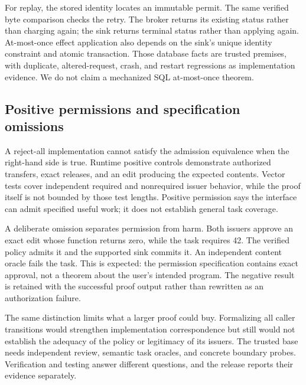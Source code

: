 For replay, the stored identity locates an immutable permit. The same verified
byte comparison checks the retry. The broker returns its existing status rather
than charging again; the sink returns terminal status rather than applying
again. At-most-once effect application also depends on the sink's unique identity
constraint and atomic transaction. Those database facts are trusted premises,
with duplicate, altered-request, crash, and restart regressions as implementation
evidence. We do not claim a mechanized SQL at-most-once theorem.

\subsection{Positive permissions and specification omissions}
A reject-all implementation cannot satisfy the admission equivalence when the
right-hand side is true. Runtime positive controls demonstrate authorized
transfers, exact releases, and an edit producing the expected contents. Vector
tests cover independent required and nonrequired issuer behavior, while the
proof itself is not bounded by those test lengths. Positive permission says
the interface can admit specified useful work; it does not establish general
task coverage.

A deliberate omission separates permission from harm. Both issuers approve an
exact edit whose function returns zero, while the task requires 42. The verified
policy admits it and the supported sink commits it. An independent content
oracle fails the task. This is expected: the permission specification contains
exact approval, not a theorem about the user's intended program. The negative
result is retained with the successful proof output rather than rewritten as an
authorization failure.

The same distinction limits what a larger proof could buy. Formalizing all
caller transitions would strengthen implementation correspondence but still
would not establish the adequacy of the policy or legitimacy of its issuers.
The trusted base needs independent review, semantic task oracles, and concrete
boundary probes. Verification and testing answer different questions, and the
release reports their evidence separately.
